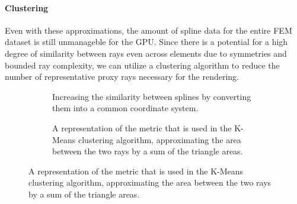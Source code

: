 \paragraph{Clustering} Even with these approximations, the amount of spline data for the entire FEM dataset is still unmanageble for the GPU. Since there is a potential for a high degree of similarity between rays even across elements due to symmetries and bounded ray complexity, we can utilize a clustering algorithm to reduce the number of representative proxy rays necessary for the rendering.

\begin{figure}
\centering
\begin{subfigure}[b]{0.4\textwidth}
    \caption{Increasing the similarity between splines by converting them into a common coordinate system.}
    \label{contribution:medbio:fem:splines}
\end{subfigure}
\hspace{2cm}
\begin{subfigure}[b]{0.4\textwidth}
    \caption{A representation of the metric that is used in the K-Means clustering algorithm, approximating the area between the two rays by a sum of the triangle areas.}
    \label{contribution:medbio:fem:metric}
\end{subfigure}
\end{figure}

